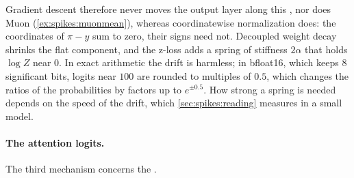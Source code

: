 \begin{refsection}
Gradient descent therefore never moves the output layer along this , nor does Muon (\cref{ex:spikes:muonmean}), whereas coordinatewise normalization does: the coordinates of $\pi-y$ sum to zero, their signs need not. Decoupled weight decay shrinks the flat component, and the z-loss adds a spring of stiffness $2\alpha$ that holds $\log Z$ near $0$. In exact arithmetic the drift is harmless; in bfloat16, which keeps $8$ significant bits, logits near $100$ are rounded to multiples of $0.5$, which changes the ratios of the probabilities by factors up to $e^{\pm0.5}$. How strong a spring is needed depends on the speed of the drift, which \cref{sec:spikes:reading} measures in a small model.

\paragraph{The attention logits.} The third mechanism concerns the .


\end{refsection}
